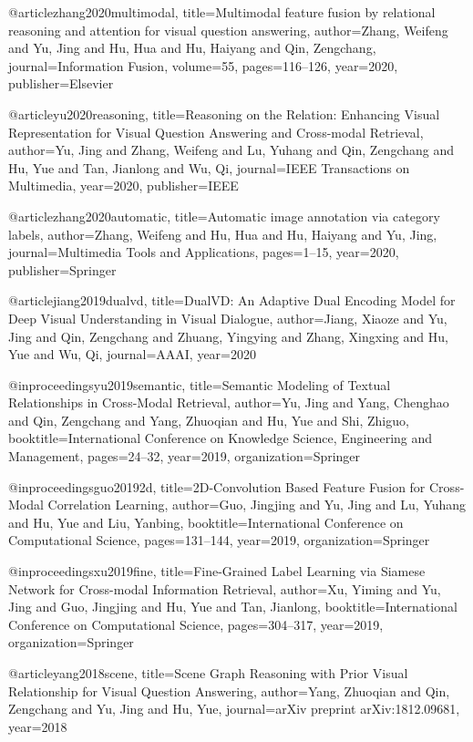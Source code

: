 @article{zhang2020multimodal,
  title={Multimodal feature fusion by relational reasoning and attention for visual question answering},
  author={Zhang, Weifeng and Yu, Jing and Hu, Hua and Hu, Haiyang and Qin, Zengchang},
  journal={Information Fusion},
  volume={55},
  pages={116--126},
  year={2020},
  publisher={Elsevier}
}

@article{yu2020reasoning,
  title={Reasoning on the Relation: Enhancing Visual Representation for Visual Question Answering and Cross-modal Retrieval},
  author={Yu, Jing and Zhang, Weifeng and Lu, Yuhang and Qin, Zengchang and Hu, Yue and Tan, Jianlong and Wu, Qi},
  journal={IEEE Transactions on Multimedia},
  year={2020},
  publisher={IEEE}
}

@article{zhang2020automatic,
  title={Automatic image annotation via category labels},
  author={Zhang, Weifeng and Hu, Hua and Hu, Haiyang and Yu, Jing},
  journal={Multimedia Tools and Applications},
  pages={1--15},
  year={2020},
  publisher={Springer}
}


@article{jiang2019dualvd,
  title={DualVD: An Adaptive Dual Encoding Model for Deep Visual Understanding in Visual Dialogue},
  author={Jiang, Xiaoze and Yu, Jing and Qin, Zengchang and Zhuang, Yingying and Zhang, Xingxing and Hu, Yue and Wu, Qi},
  journal={AAAI},
  year={2020}
}


@inproceedings{yu2019semantic,
  title={Semantic Modeling of Textual Relationships in Cross-Modal Retrieval},
  author={Yu, Jing and Yang, Chenghao and Qin, Zengchang and Yang, Zhuoqian and Hu, Yue and Shi, Zhiguo},
  booktitle={International Conference on Knowledge Science, Engineering and Management},
  pages={24--32},
  year={2019},
  organization={Springer}
}

@inproceedings{guo20192d,
  title={2D-Convolution Based Feature Fusion for Cross-Modal Correlation Learning},
  author={Guo, Jingjing and Yu, Jing and Lu, Yuhang and Hu, Yue and Liu, Yanbing},
  booktitle={International Conference on Computational Science},
  pages={131--144},
  year={2019},
  organization={Springer}
}




@inproceedings{xu2019fine,
  title={Fine-Grained Label Learning via Siamese Network for Cross-modal Information Retrieval},
  author={Xu, Yiming and Yu, Jing and Guo, Jingjing and Hu, Yue and Tan, Jianlong},
  booktitle={International Conference on Computational Science},
  pages={304--317},
  year={2019},
  organization={Springer}
}

@article{yang2018scene,
  title={Scene Graph Reasoning with Prior Visual Relationship for Visual Question Answering},
  author={Yang, Zhuoqian and Qin, Zengchang and Yu, Jing and Hu, Yue},
  journal={arXiv preprint arXiv:1812.09681},
  year={2018}
}

